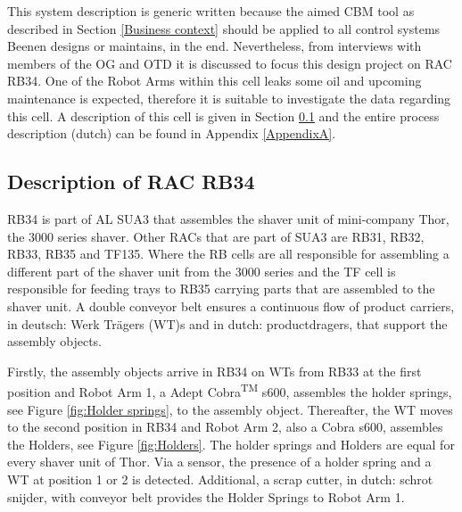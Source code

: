 This system description is generic written because the aimed CBM tool as described in Section \ref{Business context} should be applied to all control systems Beenen designs or maintains, in the end. Nevertheless, from interviews with members of the OG and OTD it is discussed to focus this design project on RAC RB34. One of the Robot Arms within this cell leaks some oil and upcoming maintenance is expected, therefore it is suitable to investigate the data regarding this cell. A description of this cell is given in Section \ref{RB34 description} and the entire process description (dutch) can be found in Appendix \ref{AppendixA}. 

\subsection{Description of RAC RB34} \label{RB34 description}
RB34 is part of AL SUA3 that assembles the shaver unit of mini-company Thor, the 3000 series shaver. Other RACs that are part of SUA3 are RB31, RB32, RB33, RB35 and TF135. Where the RB cells are all responsible for assembling a different part of the shaver unit from the 3000 series and the TF cell is responsible for feeding trays to RB35 carrying parts that are assembled to the shaver unit. A double conveyor belt ensures a continuous flow of product carriers, in deutsch: Werk Trägers (WT)s and in dutch: productdragers, that support the assembly objects. 

Firstly, the assembly objects arrive in RB34 on WTs from RB33 at the first position and Robot Arm 1, a Adept Cobra\textsuperscript{\tiny{TM}} s600, assembles the holder springs, see Figure \ref{fig:Holder springs}, to the assembly object. Thereafter, the WT moves to the second position in RB34 and Robot Arm 2, also a Cobra s600, assembles the Holders, see Figure \ref{fig:Holders}. The holder springs and Holders are equal for every shaver unit of Thor. Via a sensor, the presence of a holder spring and a WT at position 1 or 2 is detected. Additional, a scrap cutter, in dutch: schrot snijder, with conveyor belt provides the Holder Springs to Robot Arm 1.

